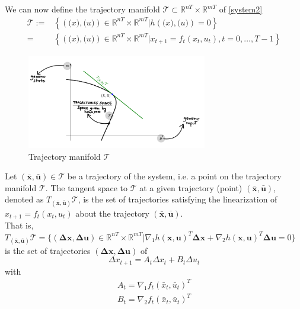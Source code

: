 \documentclass[openany]{book}
\newcommand{\R}{\mathbb{R}}               %
\newcommand{\traj}{(\bar{\mathbf{x}},\bar{\mathbf{u}})}  %
\theoremstyle{definition}
\theoremstyle{remark}
\begin{document}
We can now define the trajectory manifold $\mathcal{T}\subset \R^{nT}\times \R^{mT}$ of \eqref{system2}
\begin{align*}
    \mathcal{T} := &\left\{\left(\mathbf(x),\mathbf(u)\right)\in\R^{nT}\times\R^{mT}|h\left(\mathbf(x),\mathbf(u)\right)=0\right\}\\=&\left\{\left(\mathbf(x),\mathbf(u)\right)\in\R^{nT}\times\R^{mT}|x_{t+1}=f_t\left(x_t,u_t\right),t=0,\dots,T-1\right\}
\end{align*}
\begin{figure}[ht]
    \centering
    \includegraphics[width=0.7\textwidth]{manifold}
    \caption{Trajectory manifold $\mathcal{T}$}
\end{figure}

Let $\traj\in\mathcal{T}$ be a trajectory of the system, i.e. a point on the trajectory manifold $\mathcal{T}$. The tangent space to $\mathcal{T}$ at a given trajectory (point) $\traj$, denoted as $T_{(\bar{\mathbf{x}},\bar{\mathbf{u}})}\mathcal{T}$, is the set of trajectories satisfying the linearization of $x_{t+1} = f_t(x_t,u_t)$ about the trajectory $(\bar{\mathbf{x}},\bar{\mathbf{u}})$.\\
That is, $T_{(\bar{\mathbf{x}},\bar{\mathbf{u}})}\mathcal{T}=\{(\mathbf{\Delta x, \Delta u})\in\R^{nT}\times\R^{mT}|\nabla_1h(\mathbf{x},\mathbf{u})^T\mathbf{\Delta x} + \nabla_2h(\mathbf{x},\mathbf{u})^T\mathbf{\Delta u} = 0\}$ is the set of trajectories $(\mathbf{\Delta x, \Delta u})$ of
\[
    \Delta x_{t+1} = A_t\Delta x_t + B_t \Delta u_t
\]
with 
\begin{gather*}
    A_t = \nabla_1f_t(\bar{x}_t,\bar{u}_t)^T\\
    B_t = \nabla_2f_t(\bar{x}_t,\bar{u}_t)^T
\end{gather*}
\end{document}
